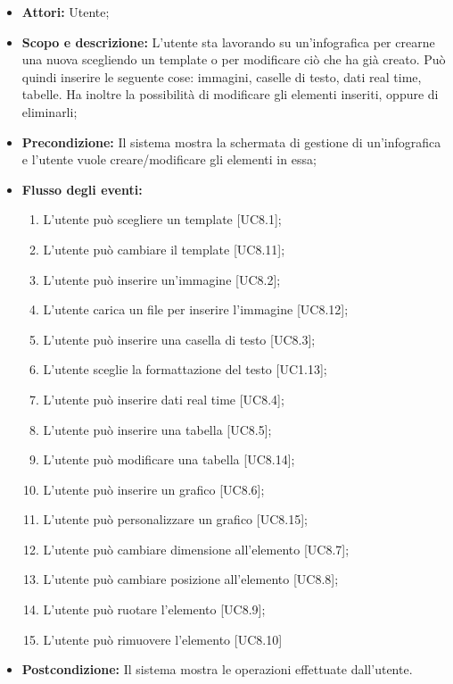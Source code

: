 \begin{itemize}
	\item \textbf{Attori:} Utente;
	\item \textbf{Scopo e descrizione:} L'utente sta lavorando su un'infografica per crearne una nuova scegliendo un template o per modificare ciò che ha già creato. Può quindi inserire le seguente cose: immagini, caselle di testo, dati real time, tabelle. Ha inoltre la possibilità di modificare gli elementi inseriti, oppure di eliminarli;
	\item \textbf{Precondizione:} Il sistema mostra la schermata di gestione di un'infografica e l'utente vuole creare/modificare gli elementi in essa;
	\item \textbf{Flusso degli eventi:}
	\begin{enumerate}
		\item L'utente può scegliere un template [UC8.1];
		\item L'utente può cambiare il template [UC8.11];
		
		\item L'utente può inserire un'immagine [UC8.2];
		\item L'utente carica un file per inserire l'immagine [UC8.12];
		
		\item L'utente può inserire una casella di testo [UC8.3];
		\item L'utente sceglie la formattazione del testo [UC1.13];
		
		\item L'utente può inserire dati real time [UC8.4];
		
		\item L'utente può inserire una tabella [UC8.5];
		\item L'utente può modificare una tabella [UC8.14];
		
		\item L'utente può inserire un grafico [UC8.6];
		\item L'utente può personalizzare un grafico [UC8.15];
		
		\item L'utente può cambiare dimensione all'elemento [UC8.7];
		
		\item L'utente può cambiare posizione all'elemento [UC8.8];
		
		\item L'utente può ruotare l'elemento [UC8.9];
		
		\item L'utente può rimuovere l'elemento [UC8.10]
	\end{enumerate}
	\item \textbf{Postcondizione:} Il sistema mostra le operazioni effettuate dall'utente.
\end{itemize}


